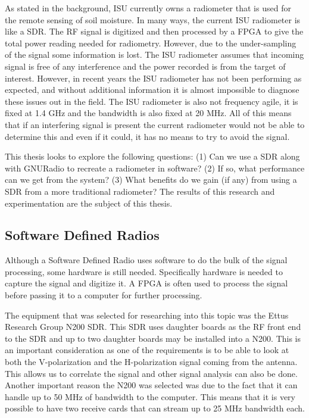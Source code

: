 As stated in the background, ISU currently owns a radiometer that is used for the remote sensing of soil moisture.  In many ways, the current ISU radiometer is like a SDR.  The RF signal is digitized and then processed by a FPGA to give the total power reading needed for radiometry.  However, due to the under-sampling of the signal some information is lost.  The ISU radiometer assumes that incoming signal is free of any interference and the power recorded is from the target of interest.  However, in recent years the ISU radiometer has not been performing as expected, and without additional information it is almost impossible to diagnose these issues out in the field.  The ISU radiometer is also not frequency agile, it is fixed at 1.4 GHz and the bandwidth is also fixed at 20 MHz.  All of this means that if an interfering signal is present the current radiometer would not be able to determine this and even if it could, it has no means to try to avoid the signal.  

This thesis looks to explore the following questions: (1) Can we use a SDR along with GNURadio to recreate a radiometer in software?  (2) If so, what performance can we get from the system?  (3) What benefits do we gain (if any) from using a SDR from a more traditional radiometer?  The results of this research and experimentation are the subject of this thesis.


\subsection{Software Defined Radios}

Although a Software Defined Radio uses software to do the bulk of the signal processing, some hardware is still needed.  Specifically hardware is needed to capture the signal and digitize it.  A FPGA is often used to process the signal before passing it to a computer for further processing.

The equipment that was selected for researching into this topic was the Ettus Research Group N200 SDR.  This SDR uses daughter boards as the RF front end to the SDR and up to two daughter boards may be installed into a N200.  This is an important consideration as one of the requirements is to be able to look at both the V-polarization and the H-polarization signal coming from the antenna.  This allows us to correlate the signal and other signal analysis can also be done.  Another important reason the N200 was selected was due to the fact that it can handle up to 50 MHz of bandwidth to the computer.  This means that it is very possible to have two receive cards that can stream up to 25 MHz bandwidth each.  

